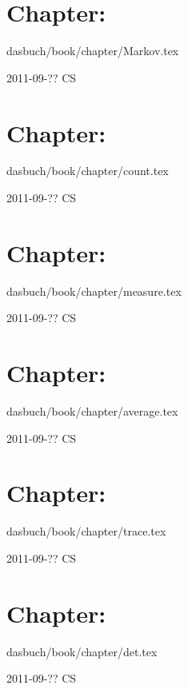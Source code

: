 \section{Chapter: }\noindent dasbuch/book/chapter/Markov.tex
\begin{description}\item[2011-09-?? CS]

\end{description}

\section{Chapter: }\noindent dasbuch/book/chapter/count.tex
\begin{description}\item[2011-09-?? CS]

\end{description}

\section{Chapter: }\noindent dasbuch/book/chapter/measure.tex
\begin{description}\item[2011-09-?? CS]

\end{description}

\section{Chapter: }\noindent dasbuch/book/chapter/average.tex
\begin{description}\item[2011-09-?? CS]

\end{description}

\section{Chapter: }\noindent dasbuch/book/chapter/trace.tex
\begin{description}\item[2011-09-?? CS]

\end{description}


\section{Chapter: }\noindent dasbuch/book/chapter/det.tex
\begin{description}\item[2011-09-?? CS]

\end{description}


